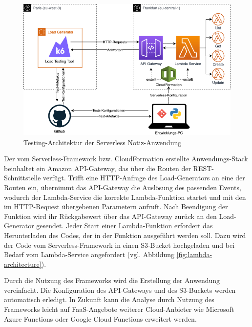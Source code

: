 \begin{figure}[H]
    \includegraphics[width=\textwidth]{img/serverless-testing-architektur.png}
    \caption[Testing-Architektur der Serverless Notiz-Anwendung]{Testing-Architektur der Serverless Notiz-Anwendung}
    \label{fig:serverless-testing-architektur}
\end{figure}

Der vom Serverless-Framework bzw. CloudFormation erstellte \linebreak Anwendungs-Stack beinhaltet ein Amazon API-Gateway, das über die Routen der REST-Schnittstelle verfügt. Trifft eine HTTP-Anfrage des Load-\linebreak Generators an eine der Routen ein, übernimmt das API-Gateway die Auslösung des passenden Events, wodurch der Lambda-Service die korrekte Lambda-Funktion startet und mit den im HTTP-Request übergebenen Parametern aufruft. Nach Beendigung der Funktion wird ihr Rückgabewert über das API-Gateway zurück an den Load-Generator gesendet. Jeder Start einer Lambda-Funktion erfordert das Herunterladen des Codes, der in der Funktion ausgeführt werden soll. Dazu wird der Code vom Serverless-Framework in einen \ac{S3}-Bucket hochgeladen und bei Bedarf vom Lambda-Service angefordert (vgl. Abbildung \ref{fig:lambda-architecture}).

Durch die Nutzung des Frameworks wird die Erstellung der Anwendung vereinfacht. Die Konfiguration des API-Gateways und des \ac{S3}-Buckets werden automatisch erledigt. In Zukunft kann die Analyse durch Nutzung des Frameworks leicht auf \ac{FaaS}-Angebote weiterer Cloud-Anbieter wie Microsoft Azure Functions oder Google Cloud Functions erweitert werden.

